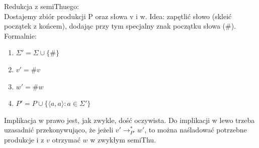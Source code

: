 \documentclass[a4paper,11pt]{article}
\newenvironment{zadanie}[1]
  {\renewcommand\theinnercustomthm{#1}\innercustomthm}
  {\endinnercustomthm}
\begin{document}
\begin{zadanie}{118}
\end{zadanie}
Redukcja z semiThuego: \\
Dostajemy zbiór produkcji P oraz słowa v i w. Idea: zapętlić słowo (skleić początek z końcem), dodając przy tym specjalny
znak początku słowa ($\#$). Formalnie:
\begin{enumerate}
 \item $\Sigma' = \Sigma \cup \{ \# \}$
 \item $v' = \# v$
 \item $w' = \# w$
 \item $P' = P \cup \{ \langle a , a \rangle : a \in \Sigma' \}$
\end{enumerate}
Implikacja w prawo jest, jak zwykle, dość oczywista. Do implikacji w lewo trzeba uzasadnić przekonywująco, że jeżeli 
$v' \longrightarrow_{P'}^* w'$, to można naśladować potrzebne produkcje i z $v$ otrzymać $w$ w zwykłym semiThu. 
\end{document}
